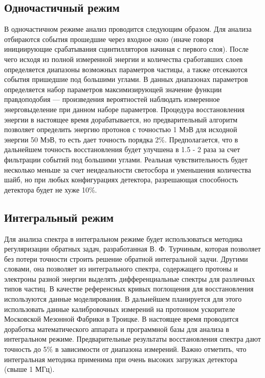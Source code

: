 \subsection{Одночастичный режим}
В одночастичном режиме анализ проводится следующим образом. Для анализа отбираются события прошедшие через входное окно (иначе говоря инициирующие срабатывания сцинтилляторов начиная с первого слоя). После чего исходя из полной измеренной энергии и количества сработавших слоев определяется диапазоны возможных параметров частицы, а также отсекаются события пришедшие под большими углами. В данных диапазонах параметров определяется набор параметров максимизирующей значение функции правдоподобия --- произведения вероятностей наблюдать измеренное энерговыделение при данном наборе параметров. Процедура восстановления энергии в настоящее время дорабатывается, но предварительный алгоритм позволяет определить энергию протонов с точностью 1 МэВ для исходной энергии 50 МэВ, то есть дает точность порядка 2\%. Предполагается, что в дальнейшем точность восстановления будет улучшена в 1.5 - 2 раза за счет фильтрации событий под большими углами. Реальная чувствительность будет несколько меньше за счет неидеальности светосбора и уменьшения количества шайб, но при любых конфигурациях детектора, разрешающая способность детектора будет не хуже 10\%.
\subsection{Интегральный режим}
Для анализа спектра в интегральном режиме будет использоваться методика регуляризации обратных задач, разработанная В. Ф. Турчиным, которая позволяет без потери точности строить решение обратной интегральной задчи. Другими словами, она позволяет из интегрального спектра, содержащего протоны и электроны разной энергии выделять дифференциальные спектры для различных типов частиц. В качестве референсных кривых поглощения для восстановления используются данные моделирования. В дальнейшем планируется для этого использовать данные калибровочных измерений на протонном ускорителе Московской Мезонной Фабрики в Троицке.
В настоящее время проводится доработка математического аппарата и программной базы для анализа в интегральном режиме. Предварительные результаты восстановления спектра дают точность до 5\% в зависимости от диапазона измерений. Важно отметить, что интегральная методика применима при очень высоких загрузках детектора (свыше 1 МГц).
